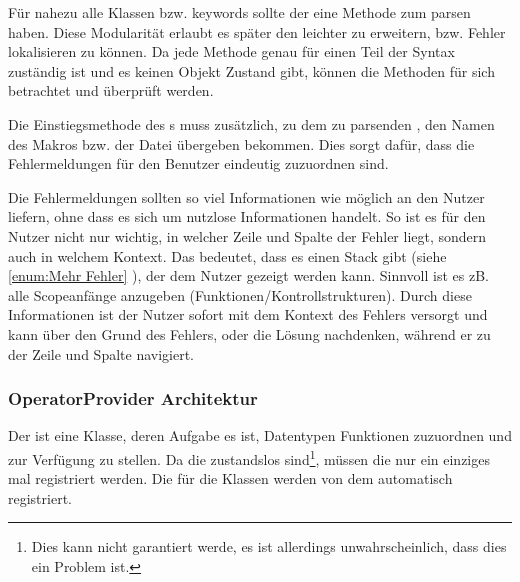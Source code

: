       Für nahezu alle  Klassen bzw. keywords sollte der  eine Methode zum parsen haben. Diese Modularität erlaubt es später den  leichter zu erweitern, bzw. Fehler lokalisieren zu können. Da jede Methode genau für einen Teil der Syntax zuständig ist und es keinen Objekt Zustand gibt, können die Methoden für sich betrachtet und überprüft werden.

      Die Einstiegsmethode des s muss zusätzlich, zu dem zu parsenden , den Namen des Makros bzw. der Datei übergeben bekommen. Dies sorgt dafür, dass die Fehlermeldungen für den Benutzer eindeutig zuzuordnen sind.

      Die Fehlermeldungen sollten so viel Informationen wie möglich an den Nutzer liefern, ohne dass es sich um nutzlose Informationen handelt. So ist es für den Nutzer nicht nur wichtig, in welcher Zeile und Spalte der Fehler liegt, sondern auch in welchem Kontext. Das bedeutet, dass es einen Stack gibt (siehe
      \ref{enum:Mehr Fehler} %
      ), der dem Nutzer gezeigt werden kann. Sinnvoll ist es zB. alle Scopeanfänge anzugeben (Funktionen/Kontrollstrukturen). Durch diese Informationen ist der Nutzer sofort mit dem Kontext des Fehlers versorgt und kann über den Grund des Fehlers, oder die Lösung  nachdenken, während er zu der Zeile und Spalte navigiert.



    \subsubsection{OperatorProvider Architektur}
    \label{sssec:OperatorProvider Architektur}
      Der  ist eine Klasse, deren Aufgabe es ist, Datentypen Funktionen zuzuordnen und zur Verfügung zu stellen. Da die  zustandslos sind\footnote{
        Dies kann nicht garantiert werde, es ist allerdings unwahrscheinlich, dass dies ein Problem ist.
      }, müssen die  nur ein einziges mal registriert werden. Die  für die  Klassen werden von dem  automatisch registriert.

